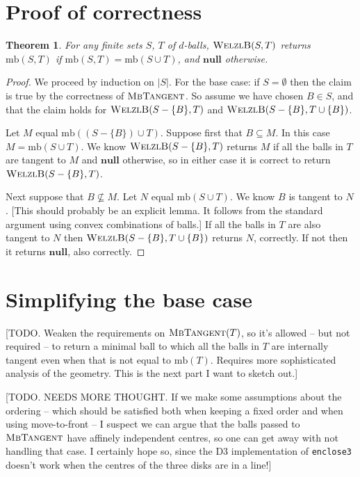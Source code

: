 \documentclass[a4paper]{article}
\newtheorem{theorem}{Theorem}[section]
\newcommand\alg[1]{\mbox{\textsc{#1}}}
\newcommand\undef{\mathbf{null}}
\newcommand\mb{\mathrm{mb}}
\begin{document}
\section{Proof of correctness}
\begin{theorem}
  For any finite sets $S$, $T$ of $d$-balls, $\alg{WelzlB}(S,T)$ returns $\mb(S,T)$ if $\mb(S,T)=\mb(S\cup T)$, and $\undef$ otherwise.
\end{theorem}
\begin{proof}
  We proceed by induction on $|S|$. For the base case: if $S=\emptyset$ then the claim is true by the correctness of $\alg{MbTangent}$. So assume we have chosen $B\in S$, and that the claim holds for $\alg{WelzlB}(S-\{B\},T)$ and $\alg{WelzlB}(S-\{B\},T\cup\{B\})$.

  Let $M$ equal $\mb((S-\{B\})\cup T)$. Suppose first that $B\subseteq M$. In this case $M=\mb(S\cup T)$. We know $\alg{WelzlB}(S-\{B\},T)$ returns $M$ if all the balls in $T$ are tangent to $M$ and $\undef$ otherwise, so in either case it is correct to return $\alg{WelzlB}(S-\{B\},T)$.

  Next suppose that $B\not\subseteq M$. Let $N$ equal $\mb(S\cup T)$. We know $B$ is tangent to $N$. [This should probably be an explicit lemma. It follows from the standard argument using convex combinations of balls.] If all the balls in $T$ are also tangent to $N$ then $\alg{WelzlB}(S-\{B\}, T\cup\{B\})$ returns $N$, correctly. If not then it returns $\undef$, also correctly.
\end{proof}

\section{Simplifying the base case}
[TODO. Weaken the requirements on $\alg{MbTangent}(T)$, so it's allowed -- but not required -- to return a minimal ball to which all the balls in $T$ are internally tangent even when that is not equal to $\mb(T)$. Requires more sophisticated analysis of the geometry. This is the next part I want to sketch out.]

[TODO. NEEDS  MORE THOUGHT. If we make some assumptions about the ordering -- which should be satisfied both when keeping a fixed order and when using move-to-front -- I suspect we can argue that the balls passed to $\alg{MbTangent}$ have affinely independent centres, so one can get away with not handling that case. I certainly hope so, since the D3 implementation of \texttt{enclose3} doesn’t work when the centres of the three disks are in a line!]
\end{document}

